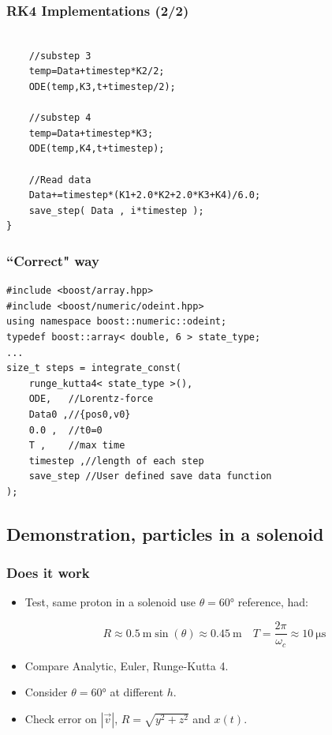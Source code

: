 \documentclass{beamer}
\begin{document}
\begin{frame}[fragile]
\frametitle{RK4 Implementations (2/2)}
\begin{lstlisting}

    //substep 3
    temp=Data+timestep*K2/2;
    ODE(temp,K3,t+timestep/2);

    //substep 4
    temp=Data+timestep*K3;
    ODE(temp,K4,t+timestep);

    //Read data
    Data+=timestep*(K1+2.0*K2+2.0*K3+K4)/6.0;
    save_step( Data , i*timestep );
}
\end{lstlisting}
\end{frame}


\begin{frame}[fragile]
\frametitle{``Correct" way}
\begin{lstlisting}
#include <boost/array.hpp>
#include <boost/numeric/odeint.hpp>
using namespace boost::numeric::odeint;
typedef boost::array< double, 6 > state_type;
...
size_t steps = integrate_const(
    runge_kutta4< state_type >(),
    ODE,   //Lorentz-force
    Data0 ,//{pos0,v0}
    0.0 ,  //t0=0
    T ,    //max time
    timestep ,//length of each step
    save_step //User defined save data function
);
\end{lstlisting}
\end{frame}

\subsection{Demonstration, particles in a solenoid}

\begin{frame}
\frametitle{Does it work}
\begin{itemize}

\item<1-> Test, same proton in a solenoid use $\theta=\ang{60}$ reference, had:

\begin{equation*}
R \approx \SI{0.5}{\meter}\sin(\theta)\approx \SI{0.45}{\meter} \quad T=\frac{2\pi}{\omega_c} \approx \SI{10}{\micro\second}
\end{equation*}

\item<2-> Compare Analytic, Euler, Runge-Kutta 4.

\item<3-> Consider $\theta=\ang{60}$ at different $h$.

\item<4-> Check error on $|\vec{v}|$, $R=\sqrt{y^2+z^2}$ and $x(t)$.
\end{itemize}
\end{frame}
\end{document}
